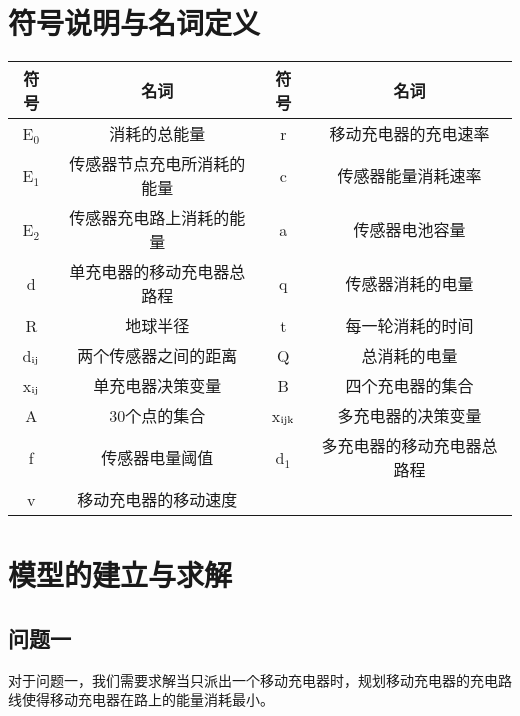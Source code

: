 \documentclass{article}
\begin{document}
\section{符号说明与名词定义}
\vspace{4ex}                %
\begin{center}              %
    \begin{tabular}{cccc}
        \toprule
        符号    & 名词  & 符号  & 名词\\
        \midrule
        E$_0$  & 消耗的总能量        & r    & 移动充电器的充电速率    \\

        E$_1$  & 传感器节点充电所消耗的能量 & c    & 传感器能量消耗速率     \\

        E$_2$  & 传感器充电路上消耗的能量  & a    & 传感器电池容量       \\

        d   & 单充电器的移动充电器总路程 & q    & 传感器消耗的电量      \\

        R   & 地球半径          & t    & 每一轮消耗的时间      \\

        d$\rm _{ij}$ & 两个传感器之间的距离    & Q    & 总消耗的电量        \\

        x$\rm _{ij}$ & 单充电器决策变量      & B    & 四个充电器的集合      \\

        A   & 30个点的集合       & x$\rm _{ijk}$ & 多充电器的决策变量     \\

        f   & 传感器电量阈值       & d$_1$   & 多充电器的移动充电器总路程 \\

        v   & 移动充电器的移动速度    &      &   \\
        \bottomrule
    \end{tabular}
\end{center}

\newpage                                                    %
\section{模型的建立与求解}
\subsection{问题一}
对于问题一，我们需要求解当只派出一个移动充电器时，规划移动充电器的充电路线使得移动充电器在路上的能量消耗最小。\\
\vspace{0.5ex}
\end{document}
